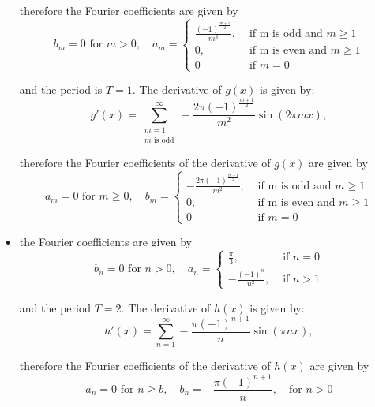 \documentclass[11pt]{article}
\begin{document}
\begin{solution}
\begin{itemize}
    therefore the Fourier coefficients are given by 
    $$
    b_m = 0 \text{ for } m >0, \quad a_m = \begin{cases}\frac{(-1)^{\frac{m+1}{2}}}{m^3}, & \text { if m is odd and }m \geq 1 \\ 0, & \text{ if m is even and } m \geq 1\\ 0 & \text{ if } m = 0  \end{cases} 
    $$

    and the period is $T = 1$. The derivative of $g(x)$ is given by:
    $$
    g'(x) = \sum_{\substack{m=1\\m \text{ is odd}}}^{\infty} -\frac{2\pi (-1)^{\frac{m+1}{2}}}{m^2}\sin(2\pi m x),
    $$

    therefore the Fourier coefficients of the derivative of $g(x)$ are given by 
    $$
    a_m = 0 \text{ for } m \geq 0, \quad b_m = \begin{cases}-\frac{2\pi (-1)^{\frac{m+1}{2}}}{m^2}, & \text { if m is odd and }m \geq 1 \\ 0, & \text{ if m is even and } m \geq 1\\ 0 & \text{ if } m = 0  \end{cases} 
    $$
    \item 
    the Fourier coefficients are given by 
    $$
    b_n = 0 \text{ for } n >0, \quad a_n = \begin{cases}\frac{\pi}{3}, & \text { if }n = 0 \\ -\frac{(-1)^n}{n^2}, & \text{ if } n > 1 \end{cases} 
    $$

    and the period $T = 2$. The derivative of $h(x)$ is given by:
    $$
    h'(x) =\sum_{n=1}^{\infty} -\frac{\pi(-1)^{n+1}}{n}\sin(\pi n x),
    $$

    therefore the Fourier coefficients of the derivative of $h(x)$ are given by 
    $$
    a_n = 0 \text{ for } n \geq b, \quad b_n = -\frac{\pi(-1)^{n+1}}{n},\quad \text{for }n > 0
    $$
    \end{itemize}
\end{solution}
\end{document}
